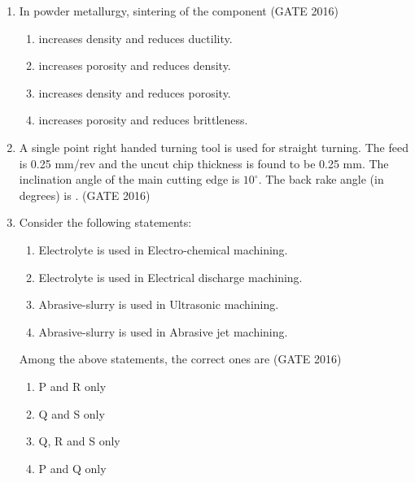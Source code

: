 \documentclass[journal,12pt,onecolumn]{IEEEtran}
\theoremstyle{remark}
\begin{document}
\begin{enumerate}
\begin{multicols}{4}
\begin{enumerate}
    \item Cellulose
    \item Nylon
    \item Polyester
    \item Polyvinyl chloride
\end{enumerate}
\end{multicols}

\vspace{0.5cm}

\item In powder metallurgy, sintering of the component  \hfill{(GATE 2016)}

\begin{multicols}{2}
\begin{enumerate}
    \item increases density and reduces ductility.
    \item increases porosity and reduces density.
    \item increases density and reduces porosity.
    \item increases porosity and reduces brittleness.
\end{enumerate}
\end{multicols}

\vspace{0.5cm}

\item A single point right handed turning tool is used for straight turning. 
The feed is 0.25 mm/rev and the uncut chip thickness is found to be 0.25 mm. 
The inclination angle of the main cutting edge is $10^\circ$. 
The back rake angle (in degrees) is \underline{\hspace{2cm}}.  \hfill{(GATE 2016)}


\item Consider the following statements:
\begin{enumerate}[label=(\Alph*)]
    \item Electrolyte is used in Electro-chemical machining.
    \item Electrolyte is used in Electrical discharge machining.
    \item Abrasive-slurry is used in Ultrasonic machining.
    \item Abrasive-slurry is used in Abrasive jet machining.
\end{enumerate}
Among the above statements, the correct ones are \hfill{(GATE 2016)}
\begin{multicols}{2}
\begin{enumerate}
    \item P and R only
    \item Q and S only
    \item Q, R and S only
    \item P and Q only
\end{enumerate}
\end{multicols}
\vspace{0.5cm}


\end{enumerate}
\end{document}
